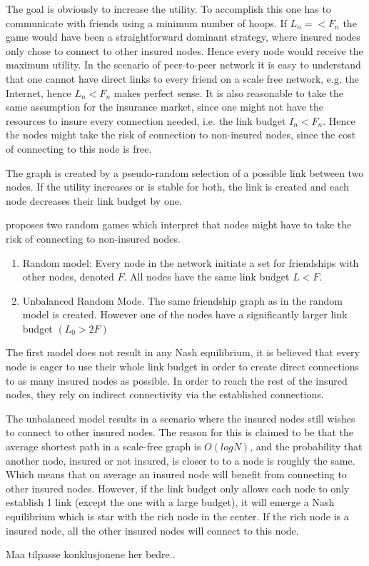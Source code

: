 The goal is obviously to increase the utility. To accomplish this one has to communicate with friends using a minimum number of hoops. If $L_{n}=<F_{n}$ the game would have been a straightforward dominant strategy, where insured nodes only chose to connect to other insured nodes. Hence every node would receive the maximum utility. In the scenario of peer-to-peer network it is easy to understand that one cannot have direct links to every friend on a scale free network, e.g. the Internet, hence $L_{n}<F_{n}$ makes perfect sense. It is also reasonable to take the same assumption  for the insurance market, since one might not have the resources to insure every connection needed, i.e. the link budget $I_{n} < F_{n}$. Hence the nodes might take the risk of connection to non-insured nodes, since the cost of connecting to this node is free.

The graph is created by a pseudo-random selection of a possible link between two nodes. If the utility increases or is stable for both, the link is created and each node decreases their link budget by one.

 
\cite{danezis2006network} proposes two random games which interpret that nodes might have to take the risk of connecting to non-insured nodes.
\begin{enumerate}
\item Random model: Every node in the network initiate a set for friendships with other nodes, denoted $F$. All nodes have the same link budget $L<F$. 
\item Unbalanced Random Mode. The same friendship graph as in the random model is created. However one of the nodes have a significantly larger link budget $(L_{0} > 2 F)$
\end{enumerate}

The first model does not result in any Nash equilibrium, it is believed that every node is eager to use their whole link budget in order to create direct connections to as many insured nodes as possible. In order to reach the rest of the insured nodes, they rely on indirect connectivity via the established connections.

The unbalanced model results in a scenario where the insured nodes still wishes to connect to other insured nodes. The reason for this is claimed to be that the average shortest path in a scale-free graph is $O(log N)$, and the probability that another node, insured or not insured, is closer to to a node is roughly the same. Which means that on average an insured node will benefit from connecting to other insured nodes. 
However, if the link budget only allows each node to only establish 1 link (except the one with a large budget), it will emerge a Nash equilibrium which is star with the rich node in the center. If the rich node is a insured node, all the other insured nodes will connect to this node. 

Maa tilpasse konklusjonene her bedre..






